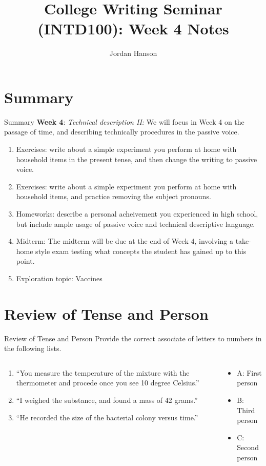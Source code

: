 \documentclass{beamer}
\title{College Writing Seminar (INTD100): Week 4 Notes}
\author{Jordan Hanson}
\institute{Whittier College Department of Physics and Astronomy}
\begin{document}
\maketitle

\section{Summary}

\begin{frame}{Summary}
\small
\textbf{Week 4}: \textit{Technical description II:} We will focus in Week 4 on the passage of time, and describing technically
procedures in the passive voice.
\begin{enumerate}
\item Exercises: write about a simple experiment you perform at home with household items in the present tense, and then change the writing to passive voice.
\item Exercises: write about a simple experiment you perform at home with household items, and practice removing the subject pronouns.
\item Homeworks: describe a personal acheivement you experienced in high school, but include ample usage of passive voice and technical descriptive language.
\item Midterm: The midterm will be due at the end of Week 4, involving a take-home style exam testing what concepts the student has gained up to this point.
\item Exploration topic: Vaccines
\end{enumerate}
\end{frame}

\section{Review of Tense and Person}

\begin{frame}{Review of Tense and Person}
\small
\alert{Provide the correct associate of letters to numbers in the following lists.}
\begin{columns}[T]
\begin{column}{0.5\textwidth}
\begin{enumerate}
\item ``You measure the temperature of the mixture with the thermometer and procede once you see 10 degree Celsius.''
\item ``I weighed the substance, and found a mass of 42 grams.''
\item ``He recorded the size of the bacterial colony versus time.''
\end{enumerate}
\end{column}
\begin{column}{0.5\textwidth}
\begin{itemize}
\item A: First person
\item B: Third person
\item C: Second person
\end{itemize}
\end{column}
\end{columns}
\end{frame}
\end{document}
